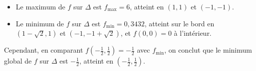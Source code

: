 {\begin{enumerate}
{	\begin{itemize}
		\item Le maximum de $f$ sur $\Delta$ est $f_{\text{max}} = 6$, atteint en $(1, 1)$ et $(-1, -1)$.
		\item Le minimum de $f$ sur $\Delta$ est $f_{\text{min}} = 0{,}3432$, atteint sur le bord en $(1 - \sqrt{2}, 1)$ et $(-1, -1 + \sqrt{2})$, et $f(0, 0) = 0$ à l'intérieur.
	\end{itemize}
	
	Cependant, en comparant $f\left(-\frac{1}{2}, \frac{1}{2}\right) = -\frac{1}{2}$ avec $f_{\text{min}}$, on conclut que le minimum global de $f$ sur $\Delta$ est $-\frac{1}{2}$, atteint en $\left(-\frac{1}{2}, \frac{1}{2}\right)$.
 }
\end{enumerate}
}